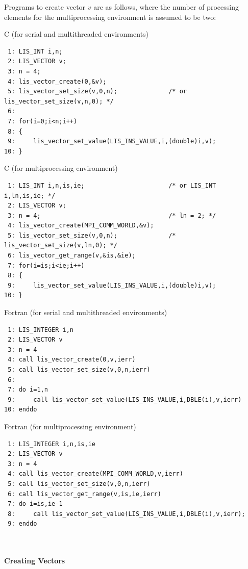\documentclass[a4paper]{article}
\begin{document}
Programs to create vector $v$ are as follows, 
where the number of processing elements for the multiprocessing environment is assumed to be two:
\begin{itembox}[l]{C (for serial and multithreaded environments)}
\small
\begin{verbatim}
 1: LIS_INT i,n;
 2: LIS_VECTOR v;
 3: n = 4;
 4: lis_vector_create(0,&v);
 5: lis_vector_set_size(v,0,n);              /* or lis_vector_set_size(v,n,0); */ 
 6:
 7: for(i=0;i<n;i++)
 8: {
 9:     lis_vector_set_value(LIS_INS_VALUE,i,(double)i,v);
10: }
\end{verbatim}
\end{itembox}
\begin{itembox}[l]{C (for multiprocessing environment)}
\small
\begin{verbatim}
 1: LIS_INT i,n,is,ie;                       /* or LIS_INT  i,ln,is,ie; */
 2: LIS_VECTOR v;
 3: n = 4;                                   /* ln = 2; */
 4: lis_vector_create(MPI_COMM_WORLD,&v);
 5: lis_vector_set_size(v,0,n);              /* lis_vector_set_size(v,ln,0); */
 6: lis_vector_get_range(v,&is,&ie);
 7: for(i=is;i<ie;i++)
 8: {
 9:     lis_vector_set_value(LIS_INS_VALUE,i,(double)i,v);
10: }
\end{verbatim}
\end{itembox}
\begin{itembox}[l]{Fortran (for serial and multithreaded environments)}
\small
\begin{verbatim}
 1: LIS_INTEGER i,n
 2: LIS_VECTOR v
 3: n = 4
 4: call lis_vector_create(0,v,ierr)
 5: call lis_vector_set_size(v,0,n,ierr)  
 6:
 7: do i=1,n
 9:     call lis_vector_set_value(LIS_INS_VALUE,i,DBLE(i),v,ierr)
10: enddo
\end{verbatim}
\end{itembox}
\begin{itembox}[l]{Fortran (for multiprocessing environment)}
\small
\begin{verbatim}
 1: LIS_INTEGER i,n,is,ie                 
 2: LIS_VECTOR v
 3: n = 4                                   
 4: call lis_vector_create(MPI_COMM_WORLD,v,ierr)
 5: call lis_vector_set_size(v,0,n,ierr)              
 6: call lis_vector_get_range(v,is,ie,ierr)
 7: do i=is,ie-1
 8:     call lis_vector_set_value(LIS_INS_VALUE,i,DBLE(i),v,ierr);
 9: enddo
\end{verbatim}
\end{itembox}
\\ \\
\noindent
{\bf Creating Vectors}
\end{document}
